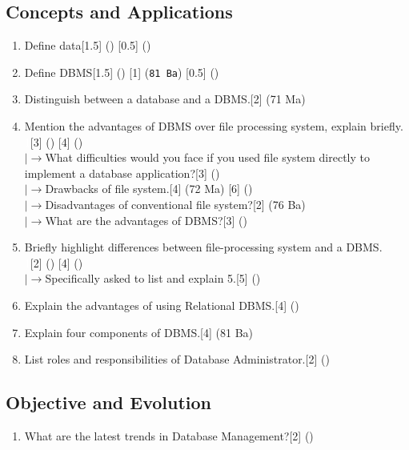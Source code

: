 \documentclass[12pt]{article}
\newcommand{\lb}{\\$\left|\rightarrow\right.$}
\newcommand{\enter}{\\\textcolor{white}{1}}
\begin{document}
    \subsection{Concepts and Applications}
    \begin{enumerate}
        \item Define data\hfill[1.5] () [0.5] ()
        \item Define DBMS\hfill[1.5] () [1] (\texttt{81 Ba}) [0.5] ()
        \item Distinguish between a database and a DBMS.\hfill [2] (71 Ma)
        \item Mention the advantages of DBMS over file processing system, explain briefly.
        \enter\hfill[3] () [4] ()
            \lb What difficulties would you face if you used file system directly to implement a database application?\hfill[3] ()
            \lb Drawbacks of file system.\hfill [4] (72 Ma) [6] ()
            \lb Disadvantages of conventional file system?\hfill[2] (76 Ba)
            \lb What are the advantages of DBMS?\hfill[3] (\texttt{})
        \item Briefly highlight differences between file-processing system and a DBMS.
        \enter\hfill[2] () [4] ()
        \lb Specifically asked to list and explain 5.\hfill [5] ()
        \item Explain the advantages of using Relational DBMS.\hfill[4] ()
        \item Explain four components of DBMS.\hfill[4] (81 Ba)
        \item List roles and responsibilities of Database Administrator.\hfill[2] ()
        \end{enumerate}
        \subsection{Objective and Evolution}
        \begin{enumerate}
        \item What are the latest trends in Database Management?\hfill[2] ()
        \end{enumerate}
\end{document}
